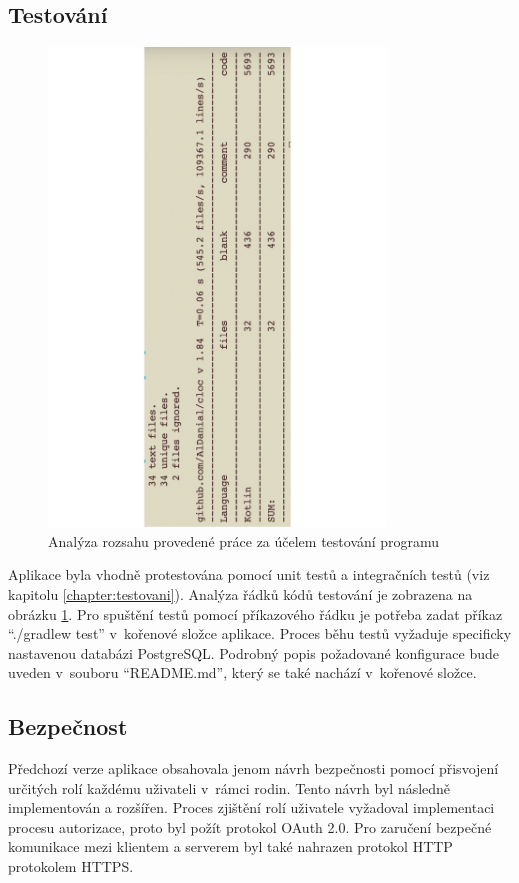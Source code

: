     \subsection{Testování}
        \begin{figure}\centering
    	   \includegraphics[angle=-90, width=0.8\textwidth]{pdfs/CodeAmountTests2}
    	   \caption[Analýza kódu testů]{Analýza rozsahu provedené práce za účelem testování programu}\label{image:code-count-test}
        \end{figure}
        Aplikace byla vhodně protestována pomocí unit testů a integračních testů (viz kapitolu \ref{chapter:testovani}). Analýza řádků kódů testování je zobrazena na obrázku \ref{image:code-count-test}. Pro spuštění testů pomocí příkazového řádku je potřeba zadat příkaz \enquote{./gradlew test} v~kořenové složce aplikace. Proces běhu testů vyžaduje specificky nastavenou databázi PostgreSQL.
        Podrobný popis požadované konfigurace bude uveden v~souboru \enquote{README.md}, který se také nachází v~kořenové složce.
    \subsection{Bezpečnost}
        Předchozí verze aplikace obsahovala jenom návrh bezpečnosti pomocí přisvojení určitých rolí každému uživateli v~rámci rodin. Tento návrh byl následně implementován a rozšířen. Proces zjištění rolí uživatele vyžadoval implementaci procesu autorizace, proto byl požít protokol OAuth 2.0. Pro zaručení bezpečné komunikace mezi klientem a serverem byl také nahrazen protokol HTTP protokolem HTTPS.
        
